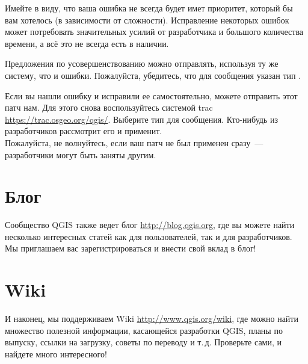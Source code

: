 Имейте в виду, что ваша ошибка не всегда будет имет приоритет, который
бы вам хотелось (в зависимости от сложности). Исправление некоторых
ошибок может потребовать значительных усилий от разработчика и большого
количества времени, а всё это не всегда есть в наличии.

Предложения по усовершенствованию можно отправлять, используя ту же
систему, что и ошибки. Пожалуйста, убедитесь, что для сообщения указан
тип .

Если вы нашли ошибку и исправили ее самостоятельно, можете отправить
этот патч нам. Для этого снова воспользуйтесь системой trac
\url{https://trac.osgeo.org/qgis/}. Выберите тип  для
сообщения. Кто-нибудь из разработчиков рассмотрит его и применит. \\
Пожалуйста, не волнуйтесь, если ваш патч не был применен сразу~---
разработчики могут быть заняты другим.


\section{Блог}
Сообщество QGIS также ведет блог \url{http://blog.qgis.org},
где вы можете найти несколько интересных статей как для пользователей,
так и для разработчиков. Мы приглашаем вас зарегистрироваться и внести
свой вклад в блог!

\section{Wiki}
И наконец, мы поддерживаем Wiki \url{http://www.qgis.org/wiki}, где
можно найти множество полезной информации, касающейся разработки QGIS,
планы по выпуску, ссылки на загрузку, советы по переводу и т.\,д.
Проверьте сами, и найдете много интересного!
